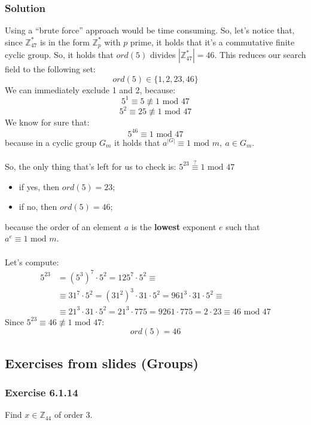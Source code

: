 \documentclass[11pt, a4paper]{article}
\newcommand{\doublequotes}[1]{“#1”}
\newcommand{\mymod}{
    \text{ mod }
}
\newcommand{\isEquivOrNot}{\stackrel{\text{?}}{\equiv}}
\begin{document}
\subsubsection*{Solution}
Using a \doublequotes{brute force} approach would be time consuming. So, let's notice that, since $\mathbb{Z}_{47}^*$ is in the form $\mathbb{Z}_p^*$ with $p$ prime, it holds that it's a commutative finite cyclic group. So, it holds that $ord(5)$ divides $|\mathbb{Z}_{47}^*|=46$. This reduces our search field to the following set:
$$ord(5)\in\{1, 2, 23, 46\}$$
We can immediately exclude 1 and 2, because:
$$5^1\equiv5\not\equiv1\mymod47$$
$$5^2\equiv25\not\equiv1\mymod47$$
We know for sure that:
$$5^{46}\equiv1\mymod47$$
because in a cyclic group $G_m$ it holds that $a^{|G|}\equiv1\mymod m,\ a\in G_m$.\\\\
So, the only thing that's left for us to check is: $5^{23}\isEquivOrNot1\mymod47$
\begin{itemize}
    \item if yes, then $ord(5)=23$;
    \item if no, then $ord(5)=46$;
\end{itemize}
because the order of an element $a$ is the \textbf{lowest} exponent $e$ such that $a^e\equiv1\mymod m$.\\\\
Let's compute:
\begin{align*}
    5^{23}&=\left(5^3\right)^7\cdot5^2=125^7\cdot5^2\equiv\\
    &\equiv31^7\cdot5^2=\left(31^2\right)^3\cdot31\cdot5^2=961^3\cdot31\cdot5^2\equiv\\
    &\equiv21^3\cdot31\cdot5^2 =21^3\cdot775=9261\cdot775=2\cdot23\equiv46\mymod47
\end{align*}
Since $5^{23}\equiv46\not\equiv1\mymod47$:
$$ord(5)=46$$

\newpage
\subsection{Exercises from slides (Groups)}
\subsubsection{Exercise 6.1.14}
Find $x\in\mathbb{Z}_{44}$ of order 3.
\end{document}
